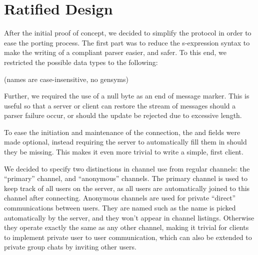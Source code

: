 \documentclass[format=sigconf]{acmart}
\begin{document}
\section{Ratified Design}\label{ratified-design}
After the initial proof of concept, we decided to simplify the protocol in order to ease the porting process. The first part was to reduce the s-expression syntax to make the writing of a compliant parser easier, and safer. To this end, we restricted the possible data types to the following:

\begin{step}
\item {}
  \begin{step}
  \item {}
  \item {}
  \end{step}
\item {} (names are case-insensitive, no gensyms)
  \begin{step}
  \item {}
  \item {}
  \end{step}
\item {}
\item {}
\end{step}

Further, we required the use of a null byte as an end of message marker. This is useful so that a server or client can restore the stream of messages should a parser failure occur, or should the update be rejected due to excessive length.

To ease the initiation and maintenance of the connection, the  and  fields were made optional, instead requiring the server to automatically fill them in should they be missing. This makes it even more trivial to write a simple, first client.

We decided to specify two distinctions in channel use from regular channels: the ``primary'' channel, and ``anonymous'' channels. The primary channel is used to keep track of all users on the server, as all users are automatically joined to this channel after connecting. Anonymous channels are used for private ``direct'' communications between users. They are named such as the name is picked automatically by the server, and they won't appear in channel listings. Otherwise they operate exactly the same as any other channel, making it trivial for clients to implement private user to user communication, which can also be extended to private group chats by inviting other users.
\end{document}
